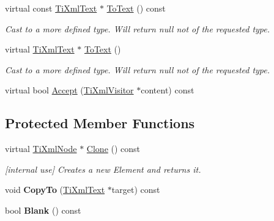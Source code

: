 \begin{DoxyCompactItemize}
\item 
\hypertarget{class_ti_xml_text_a895bf34ffad17f7439ab2a52b9651648}{virtual const \hyperlink{class_ti_xml_text}{\-Ti\-Xml\-Text} $\ast$ \hyperlink{class_ti_xml_text_a895bf34ffad17f7439ab2a52b9651648}{\-To\-Text} () const }\label{class_ti_xml_text_a895bf34ffad17f7439ab2a52b9651648}

\begin{DoxyCompactList}\small\item\em \-Cast to a more defined type. \-Will return null not of the requested type. \end{DoxyCompactList}\item 
\hypertarget{class_ti_xml_text_ae7c3a8fd3e4dbf6c0c4363a943d72f5b}{virtual \hyperlink{class_ti_xml_text}{\-Ti\-Xml\-Text} $\ast$ \hyperlink{class_ti_xml_text_ae7c3a8fd3e4dbf6c0c4363a943d72f5b}{\-To\-Text} ()}\label{class_ti_xml_text_ae7c3a8fd3e4dbf6c0c4363a943d72f5b}

\begin{DoxyCompactList}\small\item\em \-Cast to a more defined type. \-Will return null not of the requested type. \end{DoxyCompactList}\item 
virtual bool \hyperlink{class_ti_xml_text_a43b9954ebf679557fac1a4453f337b7c}{\-Accept} (\hyperlink{class_ti_xml_visitor}{\-Ti\-Xml\-Visitor} $\ast$content) const 
\end{DoxyCompactItemize}
\subsection*{\-Protected \-Member \-Functions}
\begin{DoxyCompactItemize}
\item 
\hypertarget{class_ti_xml_text_adde1869dfb029be50713fbfd8ce4d21f}{virtual \hyperlink{class_ti_xml_node}{\-Ti\-Xml\-Node} $\ast$ \hyperlink{class_ti_xml_text_adde1869dfb029be50713fbfd8ce4d21f}{\-Clone} () const }\label{class_ti_xml_text_adde1869dfb029be50713fbfd8ce4d21f}

\begin{DoxyCompactList}\small\item\em \mbox{[}internal use\mbox{]} \-Creates a new \-Element and returns it. \end{DoxyCompactList}\item 
\hypertarget{class_ti_xml_text_adcec7d9b6fccfc5777452bb97e6031c1}{void {\bfseries \-Copy\-To} (\hyperlink{class_ti_xml_text}{\-Ti\-Xml\-Text} $\ast$target) const }\label{class_ti_xml_text_adcec7d9b6fccfc5777452bb97e6031c1}

\item 
\hypertarget{class_ti_xml_text_a1c120428e3b3cf24d79706e6d2b65aa6}{bool {\bfseries \-Blank} () const }\label{class_ti_xml_text_a1c120428e3b3cf24d79706e6d2b65aa6}

\end{DoxyCompactItemize}
